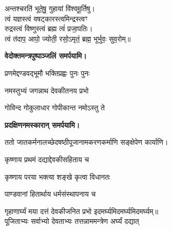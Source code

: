 \begin{center}
अन्तश्चरति॑ भूते॒षु॒ गुहायां वि॑श्वमू॒र्तिषु। \\
त्वं यज्ञस्त्वं वषट्कारस्त्वमिन्द्रस्त्वꣳ\\ रुद्रस्त्वं विष्णुस्त्वं ब्रह्म त्वं॑ प्रजा॒पतिः। \\
त्वं त॑दाप॒ आपो॒ ज्योती॒ रसो॒ऽमृतं॒ ब्रह्म॒ भूर्भुवः॒ सुव॒रोम्॥\medskip

\textbf{\devAya{} वेदोक्तमन्त्रपुष्पाञ्जलिं समर्पयामि।}
\medskip

{प्रणमेद्दण्डवद्भूमौ भक्तिप्रह्वः पुनः पुनः}
\medskip

{नमस्तुभ्यं जगन्नाथ देवकीतनय प्रभो}

{गोविन्द गोकुलाधार गोपीकान्त नमोऽस्तु ते}

\textbf{\devAya{} प्रदक्षिणनमस्कारान् समर्पयामि।}
\medskip




ततो जातकर्मनालच्छेदषष्ठीपूजानामकरणकर्माणि सङ्क्षेपेण कार्याणि।


{कृष्णाय प्रथमं दद्याद्देवकीसहिताय च}

{कृष्णाय परया भक्त्या शङ्खे कृत्वा विधानतः}
\medskip

{पाण्डवानां हितार्थाय धर्मसंस्थापनाय च}

{गृहाणार्घ्यं मया दत्तं देवकीजनित प्रभो}
\devAya{} इदमर्घ्यमिदमर्घ्यमिदमर्घ्यम्॥\medskip
\medskip\\
पूजिताभ्यः सर्वाभ्यो देवताभ्यः तत्तन्नाममन्त्रेण अर्घ्यं दद्यात् \\


\end{center}

